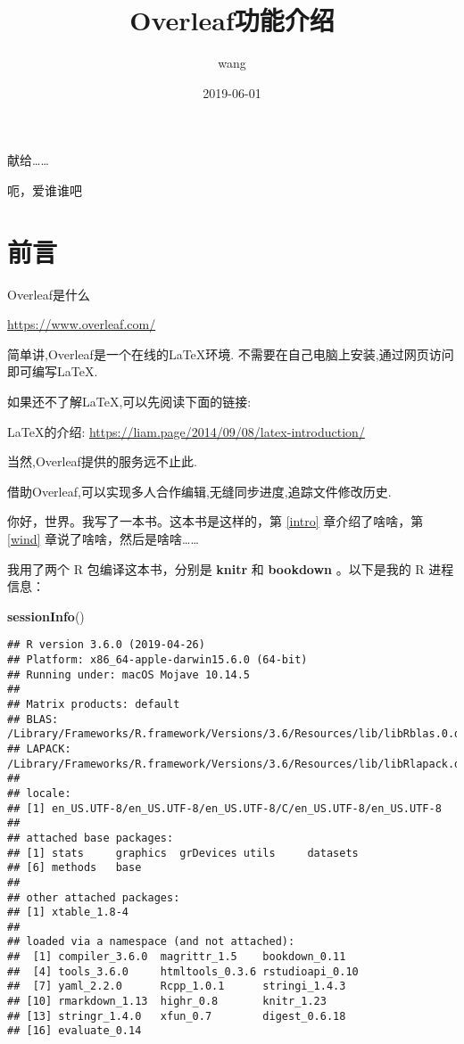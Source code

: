 \documentclass[]{ctexbook}
\title{Overleaf功能介绍}
\author{wang}
\date{2019-06-01}
\newenvironment{Shaded}{\begin{snugshade}}{\end{snugshade}}
\newcommand{\KeywordTok}[1]{\textcolor[rgb]{0.13,0.29,0.53}{\textbf{#1}}}
\newcommand{\NormalTok}[1]{#1}
\begin{document}
\maketitle


\thispagestyle{empty}

\begin{center}
献给……

呃，爱谁谁吧
\end{center}

\setlength{\abovedisplayskip}{-5pt}
\setlength{\abovedisplayshortskip}{-5pt}

{
\setcounter{tocdepth}{2}
\tableofcontents
}
\listoftables
\listoffigures
\hypertarget{section}{%
\chapter*{前言}\label{section}}


Overleaf是什么

\url{https://www.overleaf.com/}

简单讲,Overleaf是一个在线的LaTeX环境.
不需要在自己电脑上安装,通过网页访问即可编写LaTeX.

如果还不了解LaTeX,可以先阅读下面的链接:

LaTeX的介绍:
\url{https://liam.page/2014/09/08/latex-introduction/}

当然,Overleaf提供的服务远不止此.

借助Overleaf,可以实现多人合作编辑,无缝同步进度,追踪文件修改历史.

你好，世界。我写了一本书。这本书是这样的，第 \ref{intro} 章介绍了啥啥，第 \ref{wind} 章说了啥啥，然后是啥啥\ldots{}\ldots{}

我用了两个 R 包编译这本书，分别是 \textbf{knitr} \citep{xie2015} 和 \textbf{bookdown} \citep{R-bookdown}。以下是我的 R 进程信息：

\begin{Shaded}
\begin{Highlighting}[]
\KeywordTok{sessionInfo}\NormalTok{()}
\end{Highlighting}
\end{Shaded}

\begin{verbatim}
## R version 3.6.0 (2019-04-26)
## Platform: x86_64-apple-darwin15.6.0 (64-bit)
## Running under: macOS Mojave 10.14.5
## 
## Matrix products: default
## BLAS:   /Library/Frameworks/R.framework/Versions/3.6/Resources/lib/libRblas.0.dylib
## LAPACK: /Library/Frameworks/R.framework/Versions/3.6/Resources/lib/libRlapack.dylib
## 
## locale:
## [1] en_US.UTF-8/en_US.UTF-8/en_US.UTF-8/C/en_US.UTF-8/en_US.UTF-8
## 
## attached base packages:
## [1] stats     graphics  grDevices utils     datasets 
## [6] methods   base     
## 
## other attached packages:
## [1] xtable_1.8-4
## 
## loaded via a namespace (and not attached):
##  [1] compiler_3.6.0  magrittr_1.5    bookdown_0.11  
##  [4] tools_3.6.0     htmltools_0.3.6 rstudioapi_0.10
##  [7] yaml_2.2.0      Rcpp_1.0.1      stringi_1.4.3  
## [10] rmarkdown_1.13  highr_0.8       knitr_1.23     
## [13] stringr_1.4.0   xfun_0.7        digest_0.6.18  
## [16] evaluate_0.14
\end{verbatim}
\end{document}

